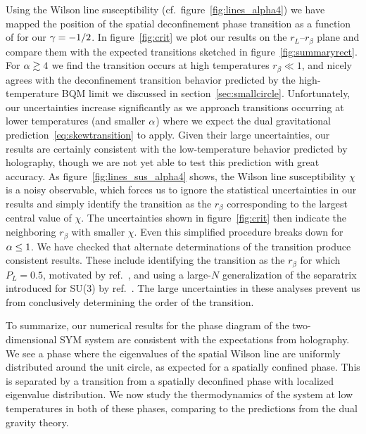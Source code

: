Using the Wilson line susceptibility (cf.\ figure~\ref{fig:lines_alpha4}) we have mapped the position of the spatial deconfinement phase transition as a function of \al for our $\gamma = -1 / 2$.
In figure~\ref{fig:crit} we plot our results on the $r_L$--$r_{\beta}$ plane and compare them with the expected transitions sketched in figure~\ref{fig:summaryrect}.
For $\alpha \gtrsim 4$ we find the transition occurs at high temperatures $r_{\beta} \ll 1$, and nicely agrees with the deconfinement transition behavior predicted by the high-temperature BQM limit we discussed in section~\ref{sec:smallcircle}.
Unfortunately, our uncertainties increase significantly as we approach transitions occurring at lower temperatures (and smaller $\alpha$) where we expect the dual gravitational prediction~\eqref{eq:skewtransition} to apply.
Given their large uncertainties, our results are certainly consistent with the low-temperature behavior predicted by holography, though we are not yet able to test this prediction with great accuracy.
As figure~\ref{fig:lines_sus_alpha4} shows, the Wilson line susceptibility $\chi$ is a noisy observable, which forces us to ignore the statistical uncertainties in our results and simply identify the transition as the $r_{\beta}$ corresponding to the largest central value of $\chi$.
The uncertainties shown in figure~\ref{fig:crit} then indicate the neighboring $r_{\beta}$ with smaller $\chi$.
Even this simplified procedure breaks down for $\alpha \leq 1$.
We have checked that alternate determinations of the transition produce consistent results.
These include identifying the transition as the $r_{\beta}$ for which $P_L = 0.5$, motivated by ref.~\cite{Aharony:2004ig}, and using a large-$N$ generalization 
of the separatrix introduced for SU(3) by ref.~\cite{Francis:2015lha}.
The large uncertainties in these analyses prevent us from conclusively determining the order of the transition.

To summarize, our numerical results for the phase diagram of the two-dimensional SYM system are consistent with the expectations from holography.
We see a phase where the eigenvalues of the spatial Wilson line are uniformly distributed around the unit circle, as expected for a spatially confined phase.
This is separated by a transition from a spatially deconfined phase with localized eigenvalue distribution.
We now study the thermodynamics of the system at low temperatures in both of these phases, comparing to the predictions from the dual gravity theory.

